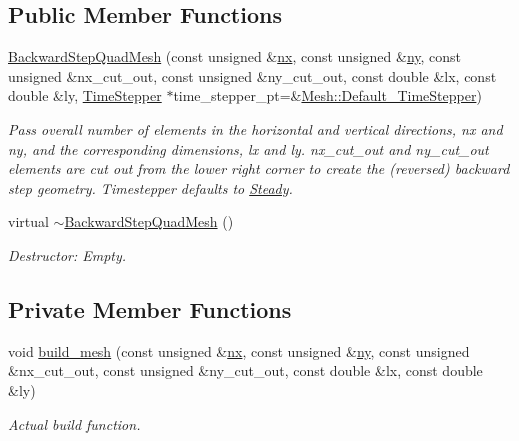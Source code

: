 \subsection*{Public Member Functions}
\begin{DoxyCompactItemize}
\item 
\hyperlink{classoomph_1_1BackwardStepQuadMesh_ae8374ae7d3646c00fec4fc9c2d604cf8}{Backward\+Step\+Quad\+Mesh} (const unsigned \&\hyperlink{classoomph_1_1RectangularQuadMesh_abfef93d6322886cdce14a437186e4821}{nx}, const unsigned \&\hyperlink{classoomph_1_1RectangularQuadMesh_a86d76a55eb7c4e8bca9b74d23c8b0412}{ny}, const unsigned \&nx\+\_\+cut\+\_\+out, const unsigned \&ny\+\_\+cut\+\_\+out, const double \&lx, const double \&ly, \hyperlink{classoomph_1_1TimeStepper}{Time\+Stepper} $\ast$time\+\_\+stepper\+\_\+pt=\&\hyperlink{classoomph_1_1Mesh_a12243d0fee2b1fcee729ee5a4777ea10}{Mesh\+::\+Default\+\_\+\+Time\+Stepper})
\begin{DoxyCompactList}\small\item\em Pass overall number of elements in the horizontal and vertical directions, nx and ny, and the corresponding dimensions, lx and ly. nx\+\_\+cut\+\_\+out and ny\+\_\+cut\+\_\+out elements are cut out from the lower right corner to create the (reversed) backward step geometry. Timestepper defaults to \hyperlink{classoomph_1_1Steady}{Steady}. \end{DoxyCompactList}\item 
virtual \hyperlink{classoomph_1_1BackwardStepQuadMesh_aec4e05ad80d83327050653ebabce9564}{$\sim$\+Backward\+Step\+Quad\+Mesh} ()
\begin{DoxyCompactList}\small\item\em Destructor\+: Empty. \end{DoxyCompactList}\end{DoxyCompactItemize}
\subsection*{Private Member Functions}
\begin{DoxyCompactItemize}
\item 
void \hyperlink{classoomph_1_1BackwardStepQuadMesh_ab71a6f2854d36b845ed79dccb0101991}{build\+\_\+mesh} (const unsigned \&\hyperlink{classoomph_1_1RectangularQuadMesh_abfef93d6322886cdce14a437186e4821}{nx}, const unsigned \&\hyperlink{classoomph_1_1RectangularQuadMesh_a86d76a55eb7c4e8bca9b74d23c8b0412}{ny}, const unsigned \&nx\+\_\+cut\+\_\+out, const unsigned \&ny\+\_\+cut\+\_\+out, const double \&lx, const double \&ly)
\begin{DoxyCompactList}\small\item\em Actual build function. \end{DoxyCompactList}\end{DoxyCompactItemize}
